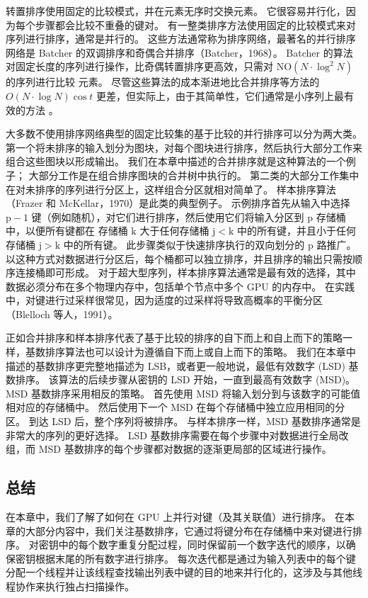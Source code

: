 转置排序使用固定的比较模式，并在元素无序时交换元素。 它很容易并行化，因为每个步骤都会比较不重叠的键对。 有一整类排序方法使用固定的比较模式来对序列进行排序，通常是并行的。 这些方法通常称为排序网络，最著名的并行排序网络是 Batcher 的双调排序和奇偶合并排序（Batcher，1968）。 Batcher 的算法对固定长度的序列进行操作，比奇偶转置排序更高效，只需对 $\mathrm{N O}\left(N \cdot \log^{2} N\right)$ 的序列进行比较 元素。 尽管这些算法的成本渐进地比合并排序等方法的 $O(N \cdot \log N) \cos t$ 更差，但实际上，由于其简单性，它们通常是小序列上最有效的方法 。

大多数不使用排序网络典型的固定比较集的基于比较的并行排序可以分为两大类。 第一个将未排序的输入划分为图块，对每个图块进行排序，然后执行大部分工作来组合这些图块以形成输出。 我们在本章中描述的合并排序就是这种算法的一个例子； 大部分工作是在组合排序图块的合并树中执行的。 第二类的大部分工作集中在对未排序的序列进行分区上，这样组合分区就相对简单了。 样本排序算法（Frazer 和 McKellar，1970）是此类的典型例子。 示例排序首先从输入中选择 $\mathrm{p}-1$ 键（例如随机），对它们进行排序，然后使用它们将输入分区到 $\mathrm{p}$ 存储桶中，以便所有键都在 存储桶 $\mathrm{k}$ 大于任何存储桶 $\mathrm{j}<\mathrm{k}$ 中的所有键，并且小于任何存储桶 $\mathrm{j}>\mathrm{k}$ 中的所有键。 此步骤类似于快速排序执行的双向划分的 p 路推广。 以这种方式对数据进行分区后，每个桶都可以独立排序，并且排序的输出只需按顺序连接桶即可形成。 对于超大型序列，样本排序算法通常是最有效的选择，其中数据必须分布在多个物理内存中，包括单个节点中多个 GPU 的内存中。 在实践中，对键进行过采样很常见，因为适度的过采样将导致高概率的平衡分区（Blelloch 等人，1991）。

正如合并排序和样本排序代表了基于比较的排序的自下而上和自上而下的策略一样，基数排序算法也可以设计为遵循自下而上或自上而下的策略。 我们在本章中描述的基数排序更完整地描述为 LSB，或者更一般地说，最低有效数字 (LSD) 基数排序。 该算法的后续步骤从密钥的 LSD 开始，一直到最高有效数字 (MSD)。 MSD 基数排序采用相反的策略。 首先使用 MSD 将输入划分到与该数字的可能值相对应的存储桶中。 然后使用下一个 MSD 在每个存储桶中独立应用相同的分区。 到达 LSD 后，整个序列将被排序。 与样本排序一样，MSD 基数排序通常是非常大的序列的更好选择。 LSD 基数排序需要在每个步骤中对数据进行全局改组，而 MSD 基数排序的每个步骤都对数据的逐渐更局部的区域进行操作。

\subsection{总结}
在本章中，我们了解了如何在 GPU 上并行对键（及其关联值）进行排序。 在本章的大部分内容中，我们关注基数排序，它通过将键分布在存储桶中来对键进行排序。 对密钥中的每个数字重复分配过程，同时保留前一个数字迭代的顺序，以确保密钥根据末尾的所有数字进行排序。 每次迭代都是通过为输入列表中的每个键分配一个线程并让该线程查找输出列表中键的目的地来并行化的，这涉及与其他线程协作来执行独占扫描操作。

